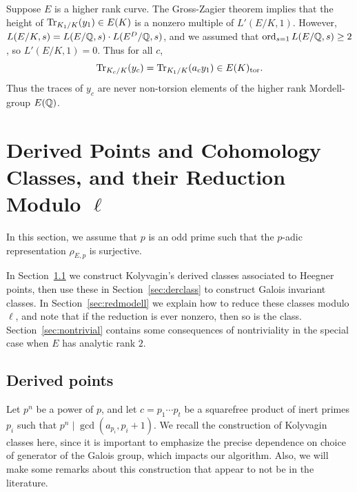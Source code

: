 \documentclass{article} \usepackage[active]{srcltx}
\begin{document}
Suppose $E$ is a higher rank curve.  The Gross-Zagier theorem \cite[\S
5.2]{gross-zagier} implies that the height of $\operatorname{Tr}_{K_1/K}(y_1) \in
E(K)$ is a nonzero multiple of $L'(E/K,1)$.  However, $L(E/K,s) =
L(E/\mathbb{Q},s)\cdot L(E^D/\mathbb{Q},s)$, and we assumed that
$\operatorname{ord}_{s=1}L(E/\mathbb{Q},s)\geq 2$, so $L'(E/K,1)=0$.  Thus for all $c$,
\begin{equation}\label{eqn:tr_yc} 
\operatorname{Tr}_{K_c/K}(y_c) = \operatorname{Tr}_{K_1/K}(a_c y_1)  \in E(K)_{\operatorname{tor}}.
\end{equation} 
Thus the traces of $y_c$ are
never non-torsion elements of the higher rank Mordell-group $E(\mathbb{Q})$.

\section{Derived Points and Cohomology Classes, and their Reduction Modulo $\ell$}
\label{sec:construct}

In this section, we assume that $p$ is an odd prime such that the
$p$-adic representation $\rho_{E,p}$ is surjective.

In Section~\ref{sec:derpts} we construct Kolyvagin's derived classes
associated to Heegner points, then use these in
Section~\ref{sec:derclass} to construct Galois invariant classes.  In
Section~\ref{sec:redmodell} we explain how to reduce these classes
modulo $\ell$, and note that if the reduction is ever nonzero, then so
is the class.  Section~\ref{sec:nontrivial} contains some consequences
of nontriviality in the special case when $E$ has analytic rank $2$.

\subsection{Derived points}\label{sec:derpts}

Let $p^n$ be a power of $p$, and 
let $c=p_1\cdots p_t$ be a squarefree product of inert primes $p_i$ 
such that $p^n\mid \gcd(a_{p_i}, p_i + 1)$.
We recall the construction of Kolyvagin classes here, since it
is important to emphasize the precise dependence on choice of
generator of the Galois group, which impacts our algorithm.
Also, we will make some remarks about this
construction that 
appear to not be in the literature.
\end{document}
